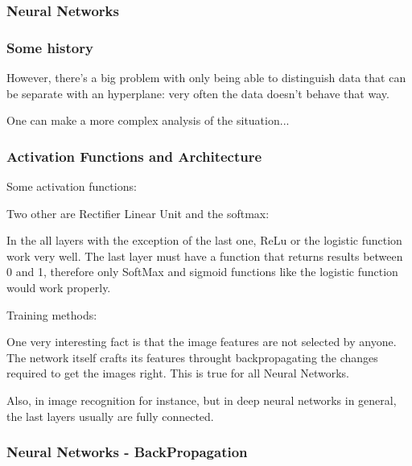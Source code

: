 \subsubsection{Neural Networks}


\subsubsection*{Some history}


However, there's a big problem with only being able to distinguish data that can be separate with an hyperplane: very often the data doesn't behave that way.


One can make a more complex analysis of the situation...



\subsubsection*{Activation Functions and Architecture}

Some activation functions: 


Two other are Rectifier Linear Unit and the softmax:



In the all layers with the exception of the last one, ReLu or the logistic function work very well. The last layer must have a function that returns results between 0 and 1, therefore only SoftMax and sigmoid functions like the logistic function would work properly.





Training methods:



One very interesting fact is that the image features are not selected by anyone. The network itself crafts its features throught backpropagating the changes required to get the images right. This is true for all Neural Networks.

Also, in image recognition for instance, but in deep neural networks in general, the last layers usually are fully connected.

\subsubsection{Neural Networks - BackPropagation}

